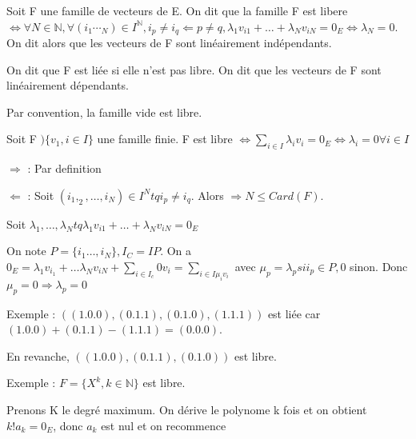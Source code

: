 \documentclass[french]{yLectureNote}
\newcommand{\N}[0]{\mathbb{N}}
\begin{document}

\begin{definition}
Soit F une famille de vecteurs de E. On dit que la famille F est libere \(\iff \forall N\in\N, \forall(i_1\dotsi_N)\in I^{\N}, i_p\neq i_q \Leftarrow p\neq q, \lambda_1v_{i1}+\dots + \lambda_N v_{iN} =0_E \iff \lambda_N = 0\). On dit alors que les vecteurs de F sont linéairement indépendants.

On dit que F est liée si elle n'est pas libre. On dit que les vecteurs de F sont linéairement dépendants.

Par convention, la famille vide est libre.
\end{definition}
\begin{proposition}
Soit F \()\{v_1, i\in I\}\) une famille finie. F est libre \(\iff \sum_{i\in I}\lambda_i v_i = 0_E \iff \lambda_i = 0 \forall i\in I\)
\end{proposition}

\begin{myproof}
$\Rightarrow$ : Par definition

$\Leftarrow$ : Soit \((i_1,_2,\dots,i_N)\in I^N tq i_p\neq i_q\). Alors \(\Rightarrow N \leq Card(F)\).

Soit \(\lambda_1,\dots,\lambda_N tq \lambda_1v_{i1}+\dots+\lambda_N v_{iN}= 0_E\)

On note \(P = \{i_1\dots,i_N\}, I_C=I P\). On a \(0_E = \lambda_1v_{i_1}+\dots \lambda_N v_{iN}+\sum_{i\in I_c}0 v_{i} = \sum_{i\in I \mu_i v_i}\) avec \(\mu_p = \lambda_p si i_p\in P, 0\) sinon. Donc \(\mu_p = 0 \Rightarrow \lambda_p = 0\)
\end{myproof}
Exemple : \(((1.0.0),(0.1.1),(0.1.0),(1.1.1))\) est liée car \((1.0.0) + (0.1.1) - (1.1.1) = (0.0.0)\).

En revanche, \(((1.0.0),(0.1.1),(0.1.0))\) est libre.

Exemple : \(F = \{X^k, k\in \N\}\) est libre.

Prenons K le degré maximum. On dérive le polynome k fois et on obtient \(k!a_k = 0_E\), donc \(a_k\) est nul et on recommence
\end{document}
